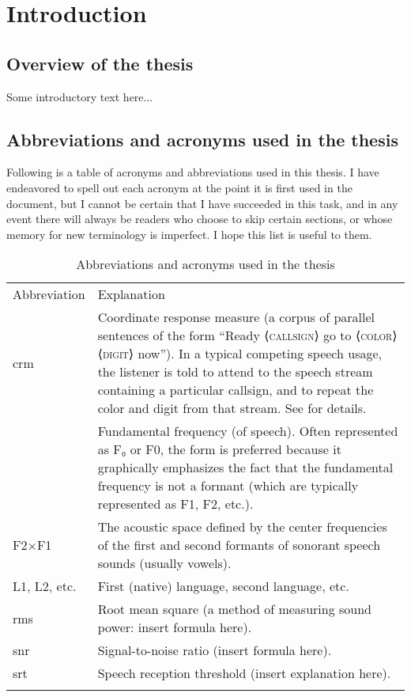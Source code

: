 \chapter{Introduction}
\section[Overview]{Overview of the thesis \label{sec:Overview}}
Some introductory text here...

\section[Abbreviations \& acronyms]{Abbreviations and acronyms used in the thesis \label{sec:Abbr}}
Following is a table of acronyms and abbreviations used in this thesis.  I have endeavored to spell out each acronym at the point it is first used in the document, but I cannot be certain that I have succeeded in this task, and in any event there will always be readers who choose to skip certain sections, or whose memory for new terminology is imperfect.  I hope this list is useful to them.

\begin{table}
	\caption[Abbreviations and acronyms]{Abbreviations and acronyms used in the thesis \label{tab:Abbr}}
	\centering
	\begin{tabu} to \textwidth [c]{X[c m] X[5 m]}
		\toprule
		\everyrow{\midrule}
		\rowfont[c]{\bfseries} Abbreviation & Explanation\\
		\ac{crm} & Coordinate response measure (a corpus of parallel sentences of the form “Ready ⟨\textsc{callsign}⟩ go to ⟨\textsc{color}⟩ ⟨\textsc{digit}⟩ now”).  In a typical competing speech usage, the listener is told to attend to the speech stream containing a particular callsign, and to repeat the color and digit from that stream.  See \citet{BoliaEtAl2000} for details.\\
		\fo & Fundamental frequency (of speech).  Often represented as F₀ or F0, the form \fo{} is preferred because it graphically emphasizes the fact that the fundamental frequency is not a formant (which are typically represented as F1, F2, etc.).\\
		F2×F1 & The acoustic space defined by the center frequencies of the first and second formants of sonorant speech sounds (usually vowels).\\
		L1, L2, etc. & First (native) language, second language, etc.\\
		\ac{rms} & Root mean square (a method of measuring sound power: insert formula here).\\
		\ac{snr} & Signal-to-noise ratio (insert formula here).\\
		\everyrow{}
		\ac{srt} & Speech reception threshold (insert explanation here).\\
		\bottomrule
	\end{tabu}
\end{table}
